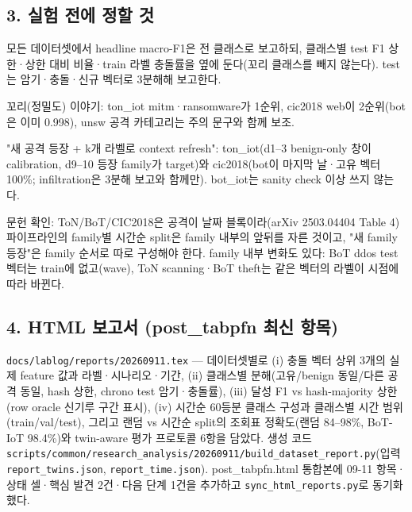 \subsection{3. 실험 전에 정할 것}
\par\noindent \textbullet\enspace 모든 데이터셋에서 headline macro-F1은 전 클래스로 보고하되, 클래스별 test F1 상한·상한 대비 비율·train 라벨 충돌률을 옆에 둔다(꼬리 클래스를 빼지 않는다). test는 암기·충돌·신규 벡터로 3분해해 보고한다.


\par\noindent \textbullet\enspace 꼬리(정밀도) 이야기: ton\_\allowbreak{}iot mitm·ransomware가 1순위, cic2018 web이 2순위(bot은 이미 0.998), unsw 공격 카테고리는 주의 문구와 함께 보조.


\par\noindent \textbullet\enspace "새 공격 등장 +\allowbreak{} k개 라벨로 context refresh": ton\_\allowbreak{}iot(d1–3 benign-only 창이 calibration, d9–10 등장 family가 target)와 cic2018(bot이 마지막 날·고유 벡터 100\%; infiltration은 3분해 보고와 함께만). bot\_\allowbreak{}iot는 sanity check 이상 쓰지 않는다.


\par\noindent \textbullet\enspace 문헌 확인: ToN/\allowbreak{}BoT/\allowbreak{}CIC2018은 공격이 날짜 블록이라(arXiv 2503.04404 Table 4) 파이프라인의 family별 시간순 split은 family 내부의 앞뒤를 자른 것이고, "새 family 등장"은 family 순서로 따로 구성해야 한다. family 내부 변화도 있다: BoT ddos test 벡터는 train에 없고(wave), ToN scanning·BoT theft는 같은 벡터의 라벨이 시점에 따라 바뀐다.


\subsection{4. HTML 보고서 (post\_\allowbreak{}tabpfn 최신 항목)}
\texttt{docs/\allowbreak{}\allowbreak{}lab\allowbreak{}log/\allowbreak{}\allowbreak{}repo\allowbreak{}rts/\allowbreak{}\allowbreak{}2026\allowbreak{}0911.\allowbreak{}tex\allowbreak{}} — 데이터셋별로 (i) 충돌 벡터 상위 3개의 실제 feature 값과 라벨·시나리오·기간, (ii) 클래스별 분해(고유/\allowbreak{}benign 동일/\allowbreak{}다른 공격 동일, hash 상한, chrono test 암기·충돌률), (iii) 달성 F1 vs hash-majority 상한(row oracle 신기루 구간 표시), (iv) 시간순 60등분 클래스 구성과 클래스별 시간 범위(train/\allowbreak{}val/\allowbreak{}test), 그리고 랜덤 vs 시간순 split의 조회표 정확도(랜덤 84–98\%, BoT-IoT 98.4\%)와 twin-aware 평가 프로토콜 6항을 담았다. 생성 코드 \texttt{scripts/\allowbreak{}\allowbreak{}common/\allowbreak{}\allowbreak{}r\allowbreak{}esearch\_\allowbreak{}\allowbreak{}analysis\allowbreak{}/\allowbreak{}\allowbreak{}2026091\allowbreak{}1/\allowbreak{}\allowbreak{}build\_\allowbreak{}\allowbreak{}dataset\_\allowbreak{}\allowbreak{}report.\allowbreak{}p\allowbreak{}y}(입력 \texttt{report\_\allowbreak{}\allowbreak{}t\allowbreak{}wins.\allowbreak{}jso\allowbreak{}n}, \texttt{report\_\allowbreak{}\allowbreak{}t\allowbreak{}ime.\allowbreak{}json\allowbreak{}}). post\_\allowbreak{}tabpfn.html 통합본에 09-11 항목·상태 셀·핵심 발견 2건·다음 단계 1건을 추가하고 \texttt{sync\_\allowbreak{}\allowbreak{}htm\allowbreak{}l\_\allowbreak{}\allowbreak{}report\allowbreak{}s.\allowbreak{}py}로 동기화했다.

